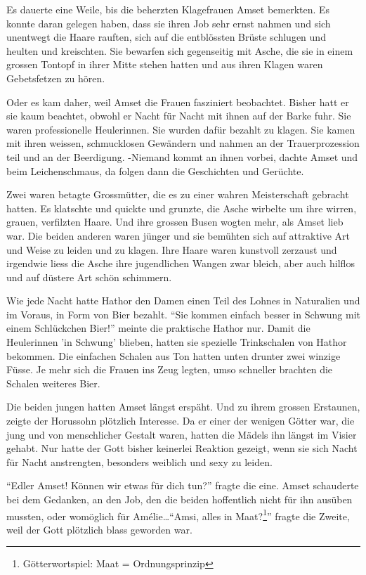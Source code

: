 \documentclass[11pt,titlepage,a5paper]{book}
\begin{document}
Es dauerte eine Weile, bis die beherzten Klagefrauen Amset bemerkten. Es konnte daran gelegen haben, dass sie ihren Job sehr ernst nahmen und sich unentwegt die Haare rauften, sich auf die entblössten Brüste schlugen und heulten und kreischten. Sie bewarfen sich gegenseitig mit Asche, die sie in einem grossen Tontopf in ihrer Mitte stehen hatten und aus ihren Klagen waren Gebetsfetzen zu hören. 

Oder es kam daher, weil Amset die Frauen fasziniert beobachtet. Bisher hatt er sie kaum beachtet, obwohl er Nacht für Nacht mit ihnen auf der Barke fuhr. Sie waren professionelle Heulerinnen. Sie wurden dafür bezahlt zu klagen. Sie kamen mit ihren weissen, schmucklosen Gewändern und nahmen an der Trauerprozession teil und an der Beerdigung. -Niemand kommt an ihnen vorbei, dachte Amset und beim Leichenschmaus, da folgen dann die Geschichten und Gerüchte. 

Zwei waren betagte Grossmütter, die es zu einer wahren Meisterschaft gebracht hatten. Es klatschte und quickte und grunzte, die Asche wirbelte um ihre wirren, grauen, verfilzten Haare. Und ihre grossen Busen wogten mehr, als Amset lieb war. Die beiden anderen waren jünger und sie bemühten sich auf attraktive Art und Weise zu leiden und zu klagen. Ihre Haare waren kunstvoll zerzaust und irgendwie liess die Asche ihre jugendlichen Wangen zwar bleich, aber auch hilflos und auf düstere Art schön schimmern.

 Wie jede Nacht hatte Hathor den Damen einen Teil des Lohnes in Naturalien und im Voraus, in Form von Bier bezahlt. "`Sie kommen einfach besser in Schwung mit einem Schlückchen Bier!"' meinte die praktische Hathor nur. Damit die Heulerinnen 'in Schwung' blieben, hatten sie spezielle Trinkschalen von Hathor bekommen. Die einfachen Schalen aus Ton hatten unten drunter zwei winzige Füsse. Je mehr sich die Frauen ins Zeug legten, umso schneller brachten die Schalen weiteres Bier.
 
Die beiden jungen hatten Amset längst erspäht. Und zu ihrem grossen Erstaunen, zeigte der Horussohn plötzlich Interesse. Da er einer der wenigen Götter war, die jung und von menschlicher Gestalt waren, hatten die Mädels ihn längst im Visier gehabt. Nur hatte der Gott bisher keinerlei Reaktion gezeigt, wenn sie sich Nacht für Nacht anstrengten, besonders weiblich und sexy zu leiden.

"`Edler Amset! Können wir etwas für dich tun?"' fragte die eine. Amset schauderte bei dem Gedanken, an den Job, den die beiden hoffentlich nicht für ihn ausüben mussten, oder womöglich für Amélie\dots "`Amsi, alles in Maat?\footnote{Götterwortspiel: Maat = Ordnungsprinzip}"' fragte die Zweite, weil der Gott plötzlich blass geworden war.
\end{document}

